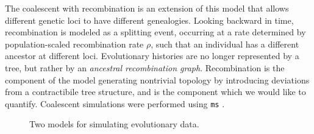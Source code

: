The coalescent with recombination is an extension of this model that allows different genetic loci to have different genealogies.
Looking backward in time, recombination is modeled as a splitting event, occurring at a rate determined by population-scaled recombination rate $\rho$, such that an individual has a different ancestor at different loci.
Evolutionary histories are no longer represented by a tree, but rather by an \emph{ancestral recombination graph}.
Recombination is the component of the model generating nontrivial topology by introducing deviations from a contractibile tree structure, and is the component which we would like to quantify.
Coalescent simulations were performed using \texttt{ms} \cite{Hudson:2002}.

\begin{figure}
\centering
    \caption{Two models for simulating evolutionary data.}
\end{figure}


